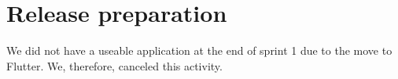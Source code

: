 \section{Release preparation}
We did not have a useable application at the end of sprint 1 due to the move to Flutter. We, therefore, canceled this activity.
